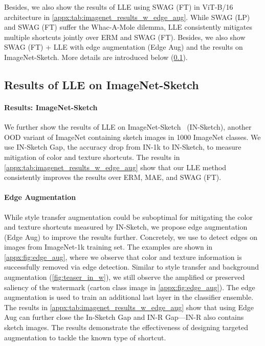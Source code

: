 \documentclass[10pt,twocolumn,letterpaper]{article}
\begin{document}
Besides, we also show the results of LLE using SWAG (FT) in ViT-B/16 architecture in \cref{appx:tab:imagenet_results_w_edge_aug}. While SWAG (LP) and SWAG (FT) suffer the Whac-A-Mole dilemma, LLE consistently mitigates multiple shortcuts jointly over ERM and SWAG (FT). Besides, we also show SWAG (FT) + LLE with edge augmentation (Edge Aug) and the results on ImageNet-Sketch. More details are introduced below (\cf \cref{appx:subsec:lle_in_sketch_results}).


\subsection{Results of LLE on ImageNet-Sketch}
\label{appx:subsec:lle_in_sketch_results}

\paragraph{Results: ImageNet-Sketch} We further show the results of LLE on ImageNet-Sketch~\cite{wang2019Adv.NeuralInf.Process.Syst.Learning} (IN-Sketch), another OOD variant of ImageNet containing sketch images in 1000 ImageNet classes. We use IN-Sketch Gap, the accuracy drop from IN-1k to IN-Sketch, to measure mitigation of color and texture shortcuts. The results in \cref{appx:tab:imagenet_results_w_edge_aug} show that our LLE method consistently improves the results over ERM, MAE, and SWAG (FT).


\paragraph{Edge Augmentation} While style transfer augmentation could be suboptimal for mitigating the color and texture shortcuts measured by IN-Sketch, we propose edge augmentation (Edge Aug) to improve the results further. Concretely, we use \cite{poma2020IEEECVFWinterConf.Appl.Comput.Vis.WACVDense} to detect edges on images from ImageNet-1k training set. The examples are shown in \cref{appx:fig:edge_aug}, where we observe that color and texture information is successfully removed via edge detection. Similar to style transfer and background augmentation (\cf \cref{fig:teaser_in_w}), we still observe the amplified or preserved saliency of the watermark (\cf carton class image in \cref{appx:fig:edge_aug}). The edge augmentation is used to train an additional last layer in the classifier ensemble. The results in \cref{appx:tab:imagenet_results_w_edge_aug} show that using Edge Aug can further close the In-Sketch Gap and IN-R Gap---IN-R also contains sketch images. The results demonstrate the effectiveness of designing targeted augmentation to tackle the known type of shortcut.
\end{document}

